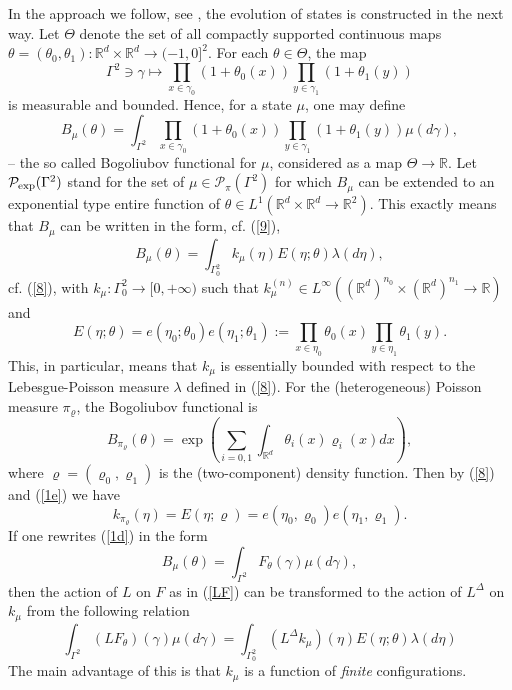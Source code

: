 \documentclass[reqno,11pt]{amsart}
\theoremstyle{definition}
\theoremstyle{remark}
\numberwithin{equation}{section}
\begin{document}
In the approach we follow, see \cite{BKKK,FKKK,KK}, the evolution of
states is constructed in the next way. Let $\varTheta$ denote the
set of all compactly supported continuous maps $\theta = (\theta_0,
\theta_1): \mathds{R}^d \times \mathds{R}^d \to (-1,0]^2$. For each
$\theta \in \varTheta$, the map
$$\Gamma^2 \ni \gamma \mapsto \prod_{x\in \gamma_0} (1+ \theta_0
(x)) \prod_{y\in \gamma_1} (1+ \theta_1 (y))$$ is measurable and
bounded. Hence, for a state $\mu$, one may define
\begin{equation}
  \label{1d}
  B_\mu (\theta) = \int_{\Gamma^2} \prod_{x\in \gamma_0} (1+ \theta_0
(x)) \prod_{y\in \gamma_1} (1+ \theta_1 (y)) \mu ( d \gamma),
\end{equation}
-- the so called  Bogoliubov functional for $\mu$, considered as a
map $\varTheta \to \mathds{R}$. Let $\mathcal{P}_{\rm
exp}(\Gamma^2)$ stand for the set of $\mu \in \mathcal{P}_\pi
(\Gamma^2)$ for which $B_\mu$ can be extended to an exponential type
entire function of $\theta \in L^1 (\mathds{R}^d\times
\mathds{R}^d\to \mathds{R}^2) $. This exactly means that $B_\mu$ can
be written in the form, cf. (\ref{9}),
\begin{equation}
  \label{1e}
 B_\mu (\theta) = \int_{\Gamma_0^2} k_\mu (\eta) E(\eta;\theta)
 \lambda (d \eta),
\end{equation}
cf. (\ref{8}), with $k_\mu:\Gamma_0^2 \to [0,+\infty)$ such that
$k_\mu^{(n)}\in L^\infty ((\mathds{R}^d)^{n_0}\times
(\mathds{R}^d)^{n_1}\to \mathds{R})$ and
\begin{equation}
  \label{1f}
 E(\eta;\theta) = e (\eta_0; \theta_0)e (\eta_1; \theta_1)  := \prod_{x\in \eta_0} \theta_0 (x) \prod_{y\in \eta_1} \theta_1
 (y).
\end{equation}
This, in particular, means that $k_\mu$ is essentially bounded with
respect to the Lebesgue-Poisson measure $\lambda$ defined in
(\ref{8}). For the (heterogeneous) Poisson measure $\pi_\varrho$,
the Bogoliubov functional is
\begin{equation}
  \label{1fa}
B_{\pi_\varrho} (\theta) = \exp\left(\sum_{i=0,1}\int_{\mathds{R}^d}
\theta_i (x) \varrho_i(x) dx \right),
\end{equation}
where $\varrho = (\varrho_0, \varrho_1)$ is the (two-component)
density function. Then by (\ref{8}) and (\ref{1e}) we have
\begin{equation}
  \label{1fb}
 k_{\pi_\varrho} (\eta)=E(\eta; \varrho) = e(\eta_0, \varrho_0)e(\eta_1,
 \varrho_1).
\end{equation}
If one rewrites (\ref{1d}) in the form
\[
B_\mu (\theta) = \int_{\Gamma^2} F_\theta (\gamma) \mu(d \gamma),
\]
then the action of $L$ on $F$ as in (\ref{LF}) can be transformed to
the action of $L^\Delta$ on $k_\mu$ from the following relation
\begin{equation}
  \label{1g}
\int_{\Gamma^2}(L F_\theta) (\gamma) \mu(d \gamma) =
\int_{\Gamma_0^2} (L^\Delta k_\mu) (\eta) E(\eta;\theta)\lambda (d
\eta)
\end{equation}
The main advantage of this is that $k_\mu$ is  a function of {\em
finite} configurations.
\end{document}
